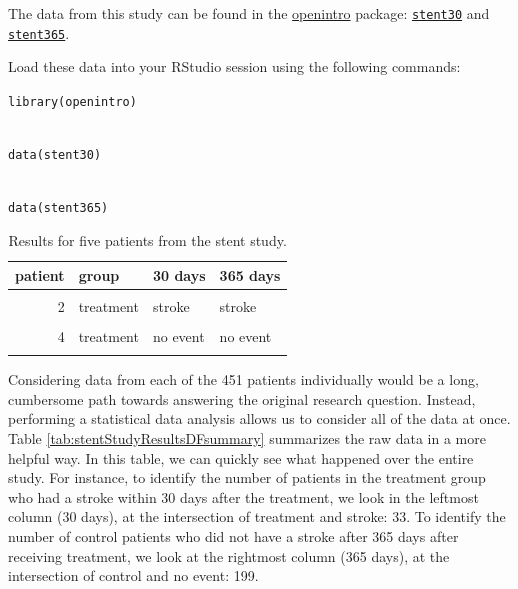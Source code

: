 \documentclass[
  10pt,
  openany]{book}
\theoremstyle{definition}
\theoremstyle{definition}
\theoremstyle{definition}
\theoremstyle{definition}
\theoremstyle{remark}
\begin{document}
The data from this study can be found in the \href{http://openintrostat.github.io/openintro}{openintro} package: \href{http://openintrostat.github.io/openintro/reference/stent30.html}{\texttt{stent30}} and \href{http://openintrostat.github.io/openintro/reference/stent365.html}{\texttt{stent365}}.

Load these data into your RStudio session using the following commands:

\texttt{library(openintro)}\strut \\
\texttt{data(stent30)}\strut \\
\texttt{data(stent365)}

\begin{table}
\centering
\caption{\label{tab:stentStudyResultsDF}Results for five patients from the stent study.}
\centering
\begin{tabular}[t]{r|l|l|l}
\hline
patient & group & 30 days & 365 days\\
\hline
\cellcolor{gray!10}{1} & \cellcolor{gray!10}{treatment} & \cellcolor{gray!10}{no event} & \cellcolor{gray!10}{no event}\\
\hline
2 & treatment & stroke & stroke\\
\hline
\cellcolor{gray!10}{3} & \cellcolor{gray!10}{treatment} & \cellcolor{gray!10}{no event} & \cellcolor{gray!10}{no event}\\
\hline
4 & treatment & no event & no event\\
\hline
\cellcolor{gray!10}{5} & \cellcolor{gray!10}{control} & \cellcolor{gray!10}{no event} & \cellcolor{gray!10}{no event}\\
\hline
\end{tabular}
\end{table}

Considering data from each of the 451 patients individually would be a long, cumbersome path towards answering the original research question.
Instead, performing a statistical data analysis allows us to consider all of the data at once.
Table \ref{tab:stentStudyResultsDFsummary} summarizes the raw data in a more helpful way.
In this table, we can quickly see what happened over the entire study.
For instance, to identify the number of patients in the treatment group who had a stroke within 30 days after the treatment, we look in the leftmost column (30 days), at the intersection of treatment and stroke: 33.
To identify the number of control patients who did not have a stroke after 365 days after receiving treatment, we look at the rightmost column (365 days), at the intersection of control and no event: 199.
\end{document}

